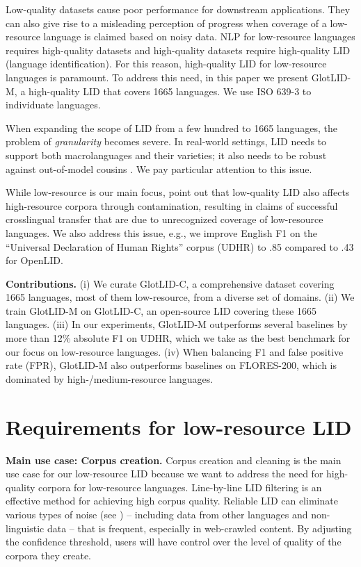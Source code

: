 \documentclass[11pt]{article}
\def\numberlanguagesaccurate{1665\xspace}
\def\modelname{\mbox{GlotLID-M}\xspace}
\def\corpusname{\mbox{GlotLID-C}\xspace}
\def\macrolanguages{macrolanguages\xspace}
\def\flores{FLORES\xspace}
\def\udhr{UDHR\xspace}
\def\edin{OpenLID\xspace}
\def\seclabel#1{\label{sec:#1}\label{p:#1}}
\begin{document}
Low-quality datasets cause poor performance for downstream applications. They can
also give rise to a misleading perception of progress when 
coverage of a low-resource language is claimed based on
noisy data.  NLP for low-resource languages
requires high-quality datasets and high-quality datasets
require high-quality LID (language identification).  For this reason, high-quality LID
for low-resource languages is paramount.  To address this
need, in this paper we present \modelname, a high-quality
LID that covers
\numberlanguagesaccurate languages.
We use ISO
639-3 to individuate languages.

When expanding the scope of LID  from
a few hundred
to \numberlanguagesaccurate
languages, the problem of \emph{granularity} becomes
severe. In real-world settings, LID needs to
support both \macrolanguages and their varieties; it also needs to
be
robust against out-of-model cousins \cite{caswell-etal-2020-language, kreutzer-etal-2022-quality}.
We pay particular attention to this issue.

While low-resource is our main focus, \citet{blevins-zettlemoyer-2022-language} point out
that low-quality LID also affects high-resource corpora
through contamination, resulting in claims of successful
crosslingual transfer that are due to unrecognized
coverage of low-resource languages. We also address this
issue, e.g., we improve English F1 on  the ``Universal Declaration of Human Rights'' corpus (\udhr) to .85
compared to .43 for \edin.

\textbf{Contributions.}
(i) We curate \corpusname, a comprehensive dataset
covering \numberlanguagesaccurate languages, most of
them low-resource, from a diverse set of domains. 
(ii) We train \modelname
on \corpusname, 
an open-source LID covering
these \numberlanguagesaccurate languages.
(iii) In our experiments, \modelname outperforms several baselines
by more than 12\% absolute F1
on \udhr, which we take as the best benchmark for our focus
on low-resource languages.
(iv) When balancing F1 and false positive rate (FPR), \modelname
also outperforms baselines on \flores-200, which is dominated
by high-/medium-resource languages.



\section{Requirements for low-resource LID}
\seclabel{reqs}

\textbf{Main use case: Corpus creation.}
Corpus creation and cleaning is the main use case for our
low-resource LID because we want to address the need for
high-quality corpora for low-resource languages.  Line-by-line
LID filtering is an effective method for achieving high
corpus quality. Reliable LID can eliminate various types
of noise (see \cite{caswell-etal-2020-language,kreutzer-etal-2022-quality})
-- including data from other languages
and non-linguistic data -- that is frequent, especially in
web-crawled content. By adjusting the confidence threshold, users
will have control over the level of quality of
the corpora they create.
\end{document}
